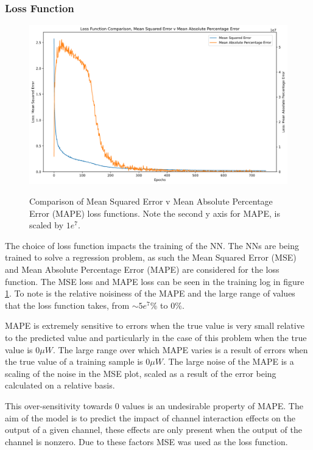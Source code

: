 \subsubsection{Loss Function} \label{subsec:loss_func} \FloatBarrier


\begin{figure}[h]
    \centering
    \caption{Comparison of Mean Squared Error v Mean Absolute Percentage Error (MAPE) loss functions. Note the second y axis for MAPE, is scaled by $1e^7$.}
    \includegraphics[width=\textwidth]{project/img/ml_model/discrete/mse_mpe.png}
    \label{fig:ml_model:mse_mpe}
\end{figure}

The choice of loss function impacts the training of the NN. The NNs are being trained to solve a regression problem, as such the Mean Squared Error (MSE) and Mean Absolute Percentage Error (MAPE) are considered for the loss function. The MSE loss and MAPE loss can be seen in the training log in figure \ref{fig:ml_model:mse_mpe}. To note is the relative noisiness of the MAPE and the large range of values that the loss function takes, from $\sim 5e^7\%$ to $0\%$.

MAPE is extremely sensitive to errors when the true value is very small relative to the predicted value and particularly in the case of this problem when the true value is $0\mu W$. The large range over which MAPE varies is a result of errors when the true value of a training sample is $0 \mu W$. The large noise of the MAPE is a scaling of the noise in the MSE plot, scaled as a result of the error being calculated on a relative basis.

This over-sensitivity towards 0 values is an undesirable property of MAPE. The aim of the model is to predict the impact of channel interaction effects on the output of a given channel, these effects are only present when the output of the channel is nonzero. Due to these factors MSE was used as the loss function. 



